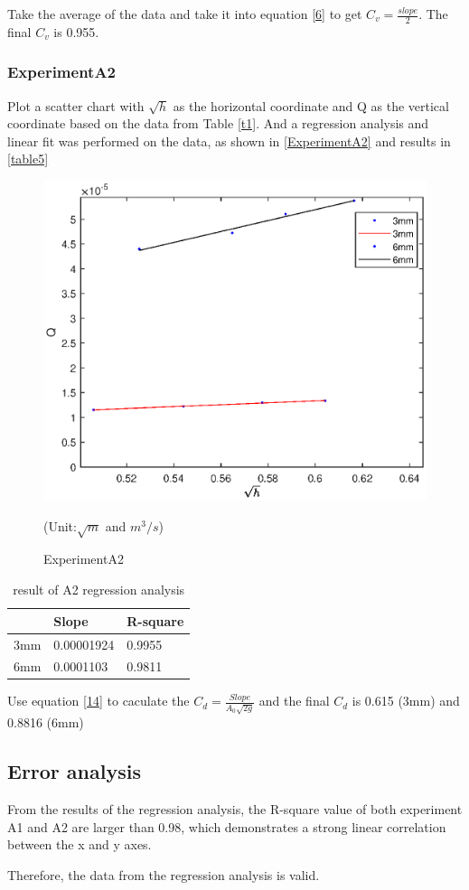 Take the average of 
the data and take it into equation \eqref{6} to get $C_v=\frac{slope}{2}$.
The final $C_v$ is 0.955.

\subsubsection{ExperimentA2}
Plot a scatter chart with $\sqrt{h}$ as the horizontal coordinate 
and Q as the vertical coordinate based on the data from Table \ref{t1}.
And a regression analysis and linear fit was performed on the data, as shown in \autoref{ExperimentA2}
and results in \autoref{table5}

\begin{figure}[h]
    \centering
    \includegraphics[width=0.75\linewidth]{Results/A2.eps}
    \caption{ExperimentA2}
    \label{ExperimentA2}
    (Unit:$\sqrt{m}$ and $m^3/s$)
\end{figure}

\begin{table}[h]
    \centering
    \begin{tabular}{l|ll}
    \hline
        & Slope    & R-square \\ \hline
    3mm & 0.00001924 & 0.9955   \\
    6mm & 0.0001103 & 0.9811   \\ \hline
    \end{tabular}
    \caption{result of A2 regression analysis}
    \label{table5}
    \end{table}


Use equation \eqref{14} to caculate the $C_d=\frac{Slope}{A_0\sqrt{2g}}$
and the final $C_d$ is 0.615 (3mm)
and 0.8816 (6mm)

\subsection{Error analysis}

From the results of the regression analysis, 
the R-square value of both experiment A1 and A2 are larger than 0.98, 
which demonstrates a strong linear correlation between the x and y axes.

Therefore, the data from the regression analysis is valid.




\FloatBarrier